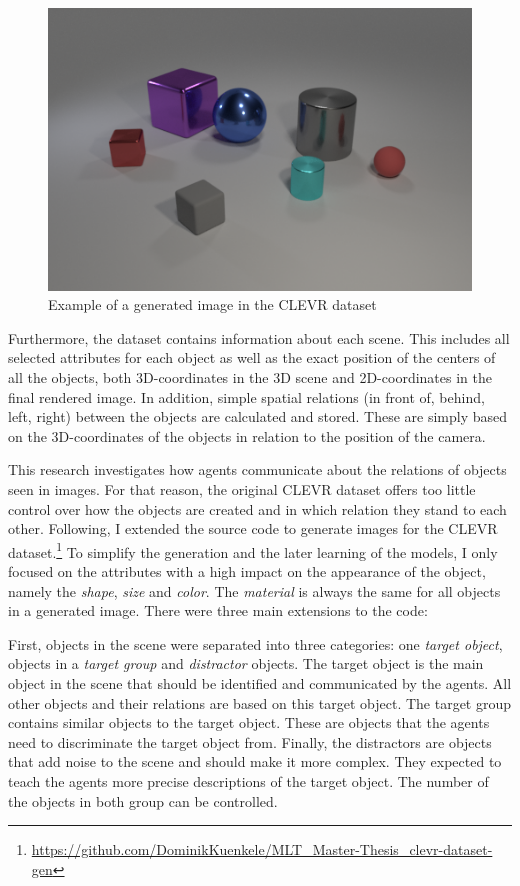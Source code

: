 \begin{figure}[h]
    \centering
    \includegraphics[width=.8\linewidth]{figures/CLEVR_example.png}
    \caption{Example of a generated image in the CLEVR dataset}
    \label{fig:clevr-example}
\end{figure}

Furthermore, the dataset contains information about each scene.
This includes all selected attributes for each object as well as the exact position of the centers of all the objects, both 3D-coordinates in the 3D scene and 2D-coordinates in the final rendered image.
In addition, simple spatial relations (in front of, behind, left, right) between the objects are calculated and stored.
These are simply based on the 3D-coordinates of the objects in relation to the position of the camera.


This research investigates how agents communicate about the relations of objects seen in images.
For that reason, the original CLEVR dataset offers too little control over how the objects are created and in which relation they stand to each other.
Following, I extended the source code to generate images for the CLEVR dataset.\footnote{\href{https://github.com/DominikKuenkele/MLT\_Master-Thesis\_clevr-dataset-gen}{https://github.com/DominikKuenkele/MLT\_Master-Thesis\_clevr-dataset-gen}}
To simplify the generation and the later learning of the models, I only focused on the attributes with a high impact on the appearance of the object, namely the \emph{shape}, \emph{size} and \emph{color}.
The \emph{material} is always the same for all objects in a generated image.
There were three main extensions to the code:

First, objects in the scene were separated into three categories: one \emph{target object}, objects in a \emph{target group} and \emph{distractor} objects.
The target object is the main object in the scene that should be identified and communicated by the agents.
All other objects and their relations are based on this target object.
The target group contains similar objects to the target object.
These are objects that the agents need to discriminate the target object from.
Finally, the distractors are objects that add noise to the scene and should make it more complex. They expected to teach the agents more precise descriptions of the target object.
The number of the objects in both group can be controlled.

